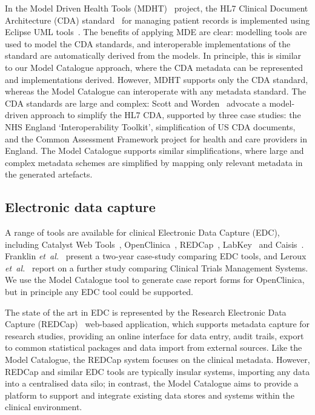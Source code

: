 In the Model Driven Health Tools (MDHT)~\cite{MDHT} project, the HL7
Clinical Document Architecture (CDA) standard~\cite{doli06} for
managing patient records is implemented using Eclipse UML
tools~\cite{EUML}. The benefits of applying MDE
are clear: modelling tools are used to model the CDA standards, and
interoperable implementations of the standard are automatically
derived from the models. In principle, this is similar to 
our Model Catalogue approach, where the CDA metadata can be represented and
implementations derived. However, MDHT supports only the CDA standard,
whereas the Model Catalogue can interoperate with any metadata
standard. The CDA standards are large and complex: 
Scott and Worden~\cite{sco12} advocate a
model-driven approach to simplify the HL7 CDA,
supported by three case studies: the NHS England `Interoperability
Toolkit', simplification of US CDA documents, and the Common
Assessment Framework project for health and care providers in
England. The Model Catalogue supports
similar simplifications, where large and complex metadata schemes are
simplified by mapping only relevant metadata in the generated
artefacts.

\subsection{Electronic data capture}

A range of tools are available for clinical Electronic Data Capture
(EDC), including Catalyst Web Tools~\cite{catalyst},
OpenClinica~\cite{oc}, REDCap~\cite{harr09}, LabKey~\cite{labk} and
Caisis~\cite{cais}. Franklin \textit{et~al.}~\cite{fran11} present
a two-year case-study comparing EDC tools, 
and Leroux \textit{et~al.}~\cite{lero11} report on
a further study comparing Clinical Trials Management Systems. 
We use the Model Catalogue tool to generate
case report forms for OpenClinica, but in principle any EDC tool could be
supported. 

The state of the art in EDC is represented by the Research Electronic Data
Capture (REDCap)~\cite{harr09} web-based application, which
supports metadata capture for research studies, providing an online
interface for data entry, audit trails, export to common statistical
packages and data import from external sources. Like the Model
Catalogue, the REDCap system focuses on the clinical
metadata. However, REDCap and similar EDC tools are typically 
insular systems, importing any data into a centralised data silo;
in contrast, the Model
Catalogue aims to provide a platform to support and integrate 
existing data stores
and systems within the clinical environment.

